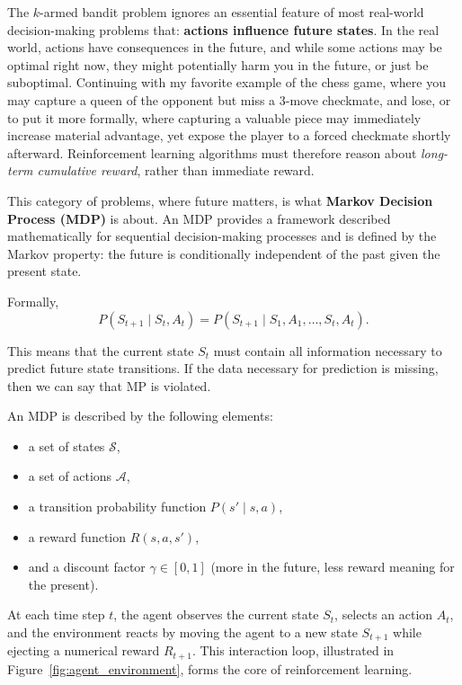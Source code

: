 The $k$-armed bandit problem  ignores an essential feature of most real-world decision-making problems that: \textbf{actions influence future states}. In the real world, actions have consequences in the future, and while some actions may be optimal right now, they might potentially harm you in the future, or just be suboptimal. Continuing with my favorite example of the chess game, where you may capture a queen of the opponent but miss a 3-move checkmate, and lose, or to put it more formally, where capturing a valuable piece may immediately increase material advantage, yet expose the player to a forced checkmate shortly afterward. Reinforcement learning algorithms must therefore reason about \emph{long-term cumulative reward}, rather than immediate reward.

This category of problems, where future matters, is what \textbf{Markov Decision Process (MDP)} is about. An MDP provides a framework described mathematically for sequential decision-making processes and is defined by the Markov property: the future is conditionally independent of the past given the present state.

Formally,
\[
P(S_{t+1} \mid S_t, A_t) = P(S_{t+1} \mid S_1, A_1, \ldots, S_t, A_t).
\]

This means that the current state $S_t$ must contain all information necessary to predict future state transitions. If the data necessary for prediction is missing, then we can say that MP is violated.


An MDP is described by the following elements:
\begin{itemize}
    \item a set of states $\mathcal{S}$,
    \item a set of actions $\mathcal{A}$,
    \item a transition probability function $P(s' \mid s, a)$,
    \item a reward function $R(s, a, s')$,
    \item and a discount factor $\gamma \in [0,1]$ (more in the future, less reward meaning for the present).
\end{itemize}

At each time step $t$, the agent observes the current state $S_t$, selects an action $A_t$, and the environment reacts by moving the agent to a new state $S_{t+1}$ while ejecting a numerical reward $R_{t+1}$. This interaction loop, illustrated in Figure~\ref{fig:agent_environment}, forms the core of reinforcement learning.

